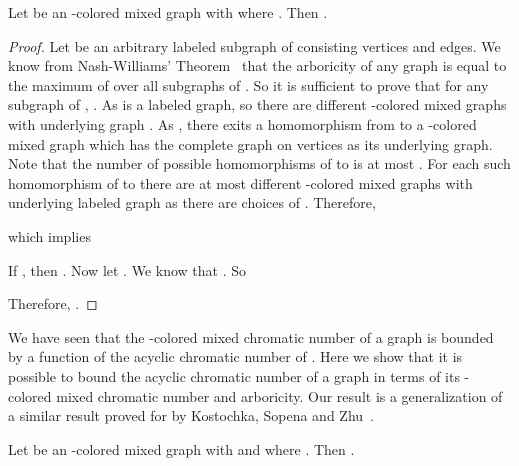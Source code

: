 \documentclass[11pt]{article}
\begin{document}
\begin{theorem}\label{chromatic-arboricity}
Let  be an -colored mixed graph with  where . Then . 
\end{theorem}

\begin{proof}
Let  be an arbitrary labeled subgraph of  consisting  vertices and  edges. We know from 
Nash-Williams' Theorem~\cite{nash1page}  that the arboricity  of any graph  is equal to the maximum of 
 over all subgraphs  of . So it is sufficient to prove that for any subgraph  of , 
. 
As  is a labeled graph, so there are  different -colored mixed graphs with underlying graph . As , there exits a homomorphism from  to a -colored mixed graph  which has the complete graph on  vertices as its underlying graph. 
Note that the number of possible homomorphisms of  to  is at most .
For each such homomorphism of   to  there are at most  different -colored mixed graphs with underlying labeled graph   as there are  choices of . 
Therefore,

  which implies 
    

If , then . Now let . We know that . So



Therefore, . 
\end{proof}


We have seen that the -colored mixed chromatic number of a graph  is bounded by a function of the acyclic chromatic number of . Here we show that
 it is possible to bound the acyclic chromatic number of a graph in terms of its -colored mixed chromatic number and arboricity.
Our result is a generalization of a similar result proved for  by  Kostochka, Sopena and Zhu~\cite{Kostochka97acyclicand}. 


\begin{theorem}\label{arboricity.chromatic-acyclic}
Let  be an -colored mixed graph with  and  where .  Then 
.
\end{theorem}
\end{document}
